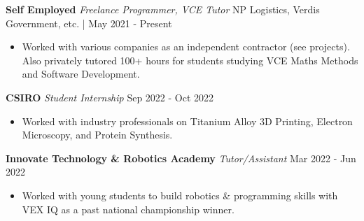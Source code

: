 \documentclass[a4paper]{article}
\begin{document}
\textbf{Self Employed} \textit{Freelance Programmer, VCE Tutor} \hfill NP Logistics, Verdis Government, etc. | May 2021 - Present\\
\vspace{-3mm}
\begin{itemize} \itemsep 0.5pt
\item Worked with various companies as an independent contractor (see projects).
Also privately tutored 100+ hours for students studying VCE Maths Methods and Software Development.
\end{itemize}
\vspace{-2mm}

\textbf{CSIRO} \textit{Student Internship} \hfill Sep 2022 - Oct 2022\\
\vspace{-3mm}
\begin{itemize} \itemsep 0.5pt
\item Worked with industry professionals on Titanium Alloy 3D Printing, Electron Microscopy, and Protein Synthesis.
\end{itemize}
\vspace{-2mm}

\textbf{Innovate Technology \& Robotics Academy} \textit{Tutor/Assistant} \hfill Mar 2022 - Jun 2022\\
\vspace{-3mm}
\begin{itemize} \itemsep 0.5pt
	\item Worked with young students to build robotics \& programming skills with VEX IQ as a past national championship winner.
\end{itemize}
\vspace{-2mm}
\end{document}
